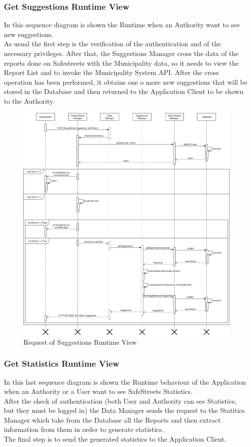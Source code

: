 \subsubsection{Get Suggestions Runtime View}
In this sequence diagram is shown the Runtime when an Authority want to see new suggestions.\\
As usual the first step is the verification of the authentication and of the necessary privileges. After that, the Suggestions Manager cross the data of the reports done on Safestreets with the Municipality data, so it needs to view the Report List and to invoke the Municipality System API. After the cross operation has been performed, it obtains one o more new suggestions that will be stored in the Database and then returned to the Application Client to be shown to the Authority.
\begin{figure}[H]
          \includegraphics[scale=0.35]{Images/Seq_viewSuggestions.png}
        \caption{Request of Suggestions Runtime View}
\end{figure}

\subsubsection{Get Statistics Runtime View}
In this last sequence diagram is shown the Runtime behaviour of the Application when an Authority or a User want to see SafeStreets Statistics.\\
After the check of authentication (both User and Authority can see Statistics, but they must be logged in) the Data Manager sends the request to the Statitics Manager which take from the Database all the Reports and then extract information from them in order to generate statistics.\\
The final step is to send the generated statistics to the Application Client.

